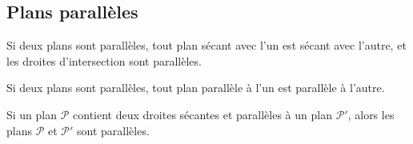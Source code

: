\subsection{Plans parallèles}

\begin{propriete}
  Si deux plans sont parallèles, tout plan sécant avec l'un est sécant avec
  l'autre, et les droites d'intersection sont parallèles.
\end{propriete}

\begin{propriete}
  Si deux plans sont parallèles, tout plan parallèle à l'un est parallèle à l'autre.
\end{propriete}

\begin{propriete}
  Si un plan $\mathcal P$ contient deux droites sécantes et parallèles à un
  plan $\mathcal P'$, alors les plans $\mathcal P$ et $\mathcal P'$ sont
  parallèles.
\end{propriete}

